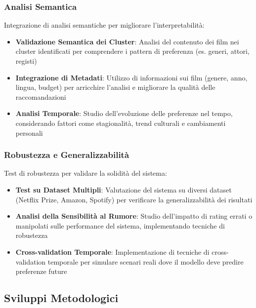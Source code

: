 \subsubsection{Analisi Semantica}

Integrazione di analisi semantiche per migliorare l'interpretabilità:

\begin{itemize}
    \item \textbf{Validazione Semantica dei Cluster}: Analisi del contenuto dei film nei cluster identificati per comprendere i pattern di preferenza (es. generi, attori, registi)
    
    \item \textbf{Integrazione di Metadati}: Utilizzo di informazioni sui film (genere, anno, lingua, budget) per arricchire l'analisi e migliorare la qualità delle raccomandazioni
    
    \item \textbf{Analisi Temporale}: Studio dell'evoluzione delle preferenze nel tempo, considerando fattori come stagionalità, trend culturali e cambiamenti personali
\end{itemize}

\subsubsection{Robustezza e Generalizzabilità}

Test di robustezza per validare la solidità del sistema:

\begin{itemize}
    \item \textbf{Test su Dataset Multipli}: Valutazione del sistema su diversi dataset (Netflix Prize, Amazon, Spotify) per verificare la generalizzabilità dei risultati
    
    \item \textbf{Analisi della Sensibilità al Rumore}: Studio dell'impatto di rating errati o manipolati sulle performance del sistema, implementando tecniche di robustezza
    
    \item \textbf{Cross-validation Temporale}: Implementazione di tecniche di cross-validation temporale per simulare scenari reali dove il modello deve predire preferenze future
\end{itemize}

\subsection{Sviluppi Metodologici}

